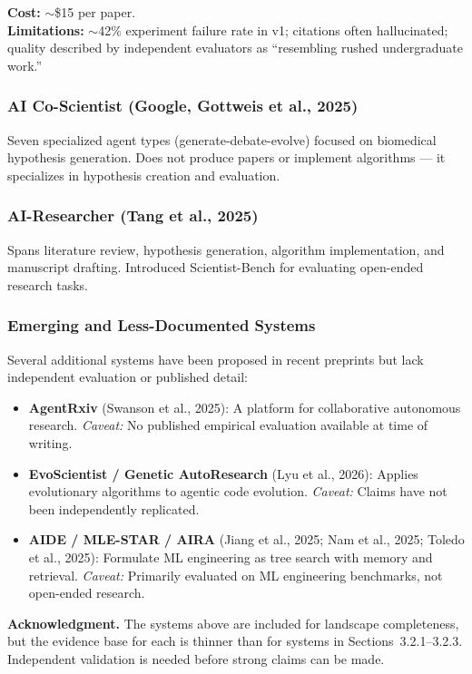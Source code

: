 \documentclass[11pt,a4paper]{article}
\begin{document}
\textbf{Cost:} $\sim$\$15 per paper.\\
\textbf{Limitations:} $\sim$42\% experiment failure rate in v1; citations often hallucinated; quality described by independent evaluators as ``resembling rushed undergraduate work.''

\subsubsection{AI Co-Scientist (Google, Gottweis et al., 2025)}

Seven specialized agent types (generate-debate-evolve) focused on biomedical hypothesis generation. Does not produce papers or implement algorithms --- it specializes in hypothesis creation and evaluation.

\subsubsection{AI-Researcher (Tang et al., 2025)}

Spans literature review, hypothesis generation, algorithm implementation, and manuscript drafting. Introduced Scientist-Bench for evaluating open-ended research tasks.

\subsubsection{Emerging and Less-Documented Systems}

Several additional systems have been proposed in recent preprints but lack independent evaluation or published detail:
\begin{itemize}[leftmargin=2em]
    \item \textbf{AgentRxiv} (Swanson et al., 2025): A platform for collaborative autonomous research. \textit{Caveat:} No published empirical evaluation available at time of writing.
    \item \textbf{EvoScientist / Genetic AutoResearch} (Lyu et al., 2026): Applies evolutionary algorithms to agentic code evolution. \textit{Caveat:} Claims have not been independently replicated.
    \item \textbf{AIDE / MLE-STAR / AIRA} (Jiang et al., 2025; Nam et al., 2025; Toledo et al., 2025): Formulate ML engineering as tree search with memory and retrieval. \textit{Caveat:} Primarily evaluated on ML engineering benchmarks, not open-ended research.
\end{itemize}

\textbf{Acknowledgment.} The systems above are included for landscape completeness, but the evidence base for each is thinner than for systems in Sections~3.2.1--3.2.3. Independent validation is needed before strong claims can be made.
\end{document}
